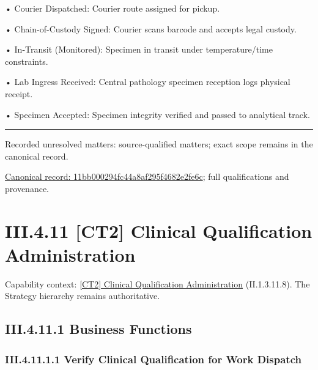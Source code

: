 •
Courier Dispatched: Courier route assigned for pickup.



•
Chain-of-Custody Signed: Courier scans barcode and accepts legal custody.



•
In-Transit (Monitored): Specimen in transit under temperature/time constraints.



•
Lab Ingress Received: Central pathology specimen reception logs physical receipt.



•
Specimen Accepted: Specimen integrity verified and passed to analytical track.



\medskip\hrule\medskip

{\small Recorded unresolved matters: source-qualified matters; exact scope remains in the canonical record.}\par
{\footnotesize \href{../../../../continuum/business/business-process/11bb000294fc44a8af295f4682e2fe6c.md}{Canonical record: 11bb000294fc44a8af295f4682e2fe6c}; full qualifications and provenance.}\par
\section*{III.4.11 [CT2] Clinical Qualification Administration}
\label{navigation:III.4.11}

{\small Capability context: \hyperref[element:0511a705d74a4f48a0ce92590ae764fa]{[CT2] Clinical Qualification Administration} (II.1.3.11.8). The Strategy hierarchy remains authoritative.}\par
\subsection*{III.4.11.1 Business Functions}
\label{navigation:III.4.11.1}

\subsubsection*{III.4.11.1.1 Verify Clinical Qualification for Work Dispatch}
\label{navigation:III.4.11.1.1}

